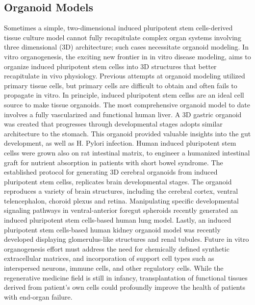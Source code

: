 \documentclass[sigconf]{acmart}
\begin{document}
\subsection{Organoid Models}
Sometimes a simple, two-dimensional  induced pluripotent stem cells-derived tissue culture model cannot fully
recapitulate complex organ systems involving three dimensional (3D) architecture; such cases
necessitate organoid modeling. In vitro organogenesis, the exciting new frontier in in vitro
disease modeling, aims to organize  induced pluripotent stem cellss into 3D structures that better recapitulate in vivo
physiology. Previous attempts at organoid modeling utilized primary tissue cells, but
primary cells are difficult to obtain and often fails to propagate in vitro. In principle,  induced pluripotent stem cellss are
an ideal cell source to make tissue organoids. 
The most comprehensive organoid model to date involves a fully vascularized and functional human liver. A 3D gastric organoid was created that progresses through developmental stages adopts similar architecture to the stomach. This organoid provided valuable insights into the gut development, as well as H. Pylori infection. Human  induced pluripotent stem cellss were grown also on rat intestinal matrix, to engineer a humanized intestinal graft for nutrient absorption in patients with short bowel syndrome. The established protocol for generating 3D cerebral organoids from  induced pluripotent stem cellss, replicates brain developmental stages. The organoid reproduces a variety of brain structures, including the cerebral cortex, ventral telencephalon, choroid plexus and retina. Manipulating specific developmental signaling pathways in ventral-anterior foregut spheroids recently generated an  induced pluripotent stem cells-based human lung model. Lastly, an  induced pluripotent stem cells-based human kidney organoid model was recently developed displaying glomerulus-like structures and renal tubules. 
Future in vitro organogenesis effort must address the need for chemically defined synthetic extracellular matrices, and incorporation of support cell types such as interspersed neurons, immune cells, and other regulatory cells. While the regenerative medicine field is still in infancy, transplantation of functional tissues derived from patient's own cells could profoundly improve the health of patients with end-organ failure. \cite{ranga2014drug}
\end{document}
